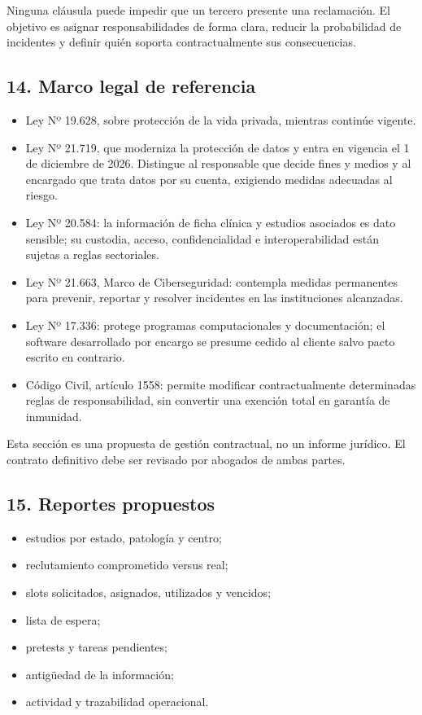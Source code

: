 \documentclass[
]{article}
\providecommand{\tightlist}{%
  \setlength{\itemsep}{0pt}\setlength{\parskip}{0pt}}
\begin{document}
Ninguna cláusula puede impedir que un tercero presente una reclamación.
El objetivo es asignar responsabilidades de forma clara, reducir la
probabilidad de incidentes y definir quién soporta contractualmente sus
consecuencias.

\hypertarget{14-marco-legal-de-referencia}{%
\subsection{14. Marco legal de
referencia}\label{14-marco-legal-de-referencia}}

\begin{itemize}
\tightlist
\item
  Ley Nº 19.628, sobre protección de la vida privada, mientras continúe
  vigente.
\item
  Ley Nº 21.719, que moderniza la protección de datos y entra en
  vigencia el 1 de diciembre de 2026. Distingue al responsable que
  decide fines y medios y al encargado que trata datos por su cuenta,
  exigiendo medidas adecuadas al riesgo.
\item
  Ley Nº 20.584: la información de ficha clínica y estudios asociados es
  dato sensible; su custodia, acceso, confidencialidad e
  interoperabilidad están sujetas a reglas sectoriales.
\item
  Ley Nº 21.663, Marco de Ciberseguridad: contempla medidas permanentes
  para prevenir, reportar y resolver incidentes en las instituciones
  alcanzadas.
\item
  Ley Nº 17.336: protege programas computacionales y documentación; el
  software desarrollado por encargo se presume cedido al cliente salvo
  pacto escrito en contrario.
\item
  Código Civil, artículo 1558: permite modificar contractualmente
  determinadas reglas de responsabilidad, sin convertir una exención
  total en garantía de inmunidad.
\end{itemize}

Esta sección es una propuesta de gestión contractual, no un informe
jurídico. El contrato definitivo debe ser revisado por abogados de ambas
partes.

\hypertarget{15-reportes-propuestos}{%
\subsection{15. Reportes propuestos}\label{15-reportes-propuestos}}

\begin{itemize}
\tightlist
\item
  estudios por estado, patología y centro;
\item
  reclutamiento comprometido versus real;
\item
  slots solicitados, asignados, utilizados y vencidos;
\item
  lista de espera;
\item
  pretests y tareas pendientes;
\item
  antigüedad de la información;
\item
  actividad y trazabilidad operacional.
\end{itemize}
\end{document}
